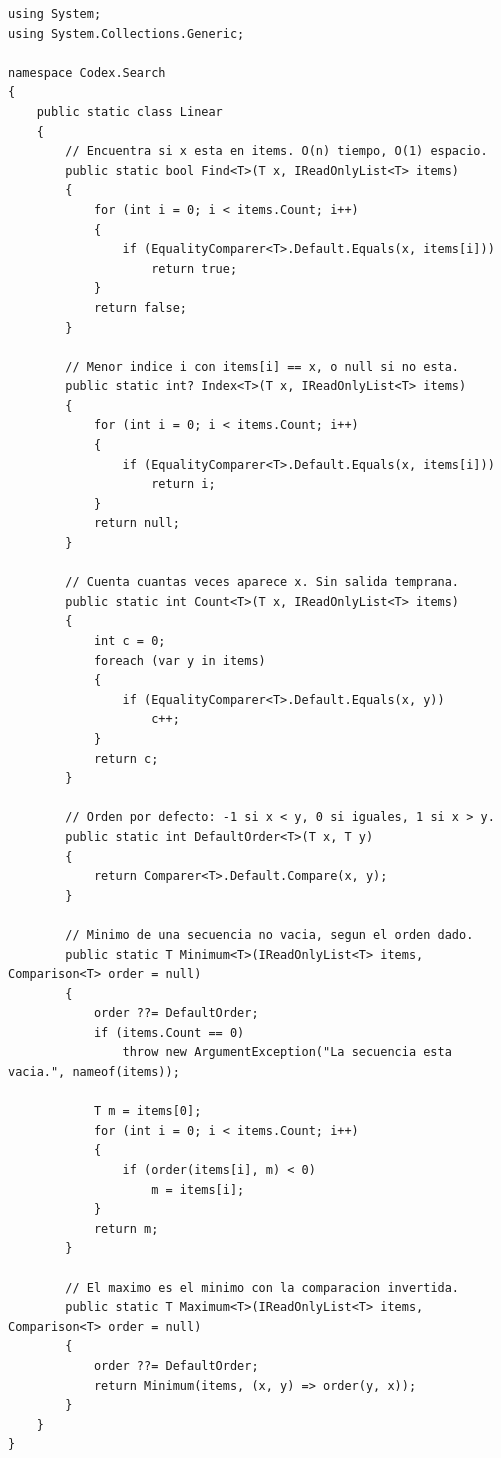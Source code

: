 \documentclass[11pt,a4paper]{article}
\begin{document}
\begin{lstlisting}[caption={\texttt{Linear.cs} --- todos los algoritmos}]
using System;
using System.Collections.Generic;

namespace Codex.Search
{
    public static class Linear
    {
        // Encuentra si x esta en items. O(n) tiempo, O(1) espacio.
        public static bool Find<T>(T x, IReadOnlyList<T> items)
        {
            for (int i = 0; i < items.Count; i++)
            {
                if (EqualityComparer<T>.Default.Equals(x, items[i]))
                    return true;
            }
            return false;
        }

        // Menor indice i con items[i] == x, o null si no esta.
        public static int? Index<T>(T x, IReadOnlyList<T> items)
        {
            for (int i = 0; i < items.Count; i++)
            {
                if (EqualityComparer<T>.Default.Equals(x, items[i]))
                    return i;
            }
            return null;
        }

        // Cuenta cuantas veces aparece x. Sin salida temprana.
        public static int Count<T>(T x, IReadOnlyList<T> items)
        {
            int c = 0;
            foreach (var y in items)
            {
                if (EqualityComparer<T>.Default.Equals(x, y))
                    c++;
            }
            return c;
        }

        // Orden por defecto: -1 si x < y, 0 si iguales, 1 si x > y.
        public static int DefaultOrder<T>(T x, T y)
        {
            return Comparer<T>.Default.Compare(x, y);
        }

        // Minimo de una secuencia no vacia, segun el orden dado.
        public static T Minimum<T>(IReadOnlyList<T> items, Comparison<T> order = null)
        {
            order ??= DefaultOrder;
            if (items.Count == 0)
                throw new ArgumentException("La secuencia esta vacia.", nameof(items));

            T m = items[0];
            for (int i = 0; i < items.Count; i++)
            {
                if (order(items[i], m) < 0)
                    m = items[i];
            }
            return m;
        }

        // El maximo es el minimo con la comparacion invertida.
        public static T Maximum<T>(IReadOnlyList<T> items, Comparison<T> order = null)
        {
            order ??= DefaultOrder;
            return Minimum(items, (x, y) => order(y, x));
        }
    }
}
\end{lstlisting}
\end{document}
